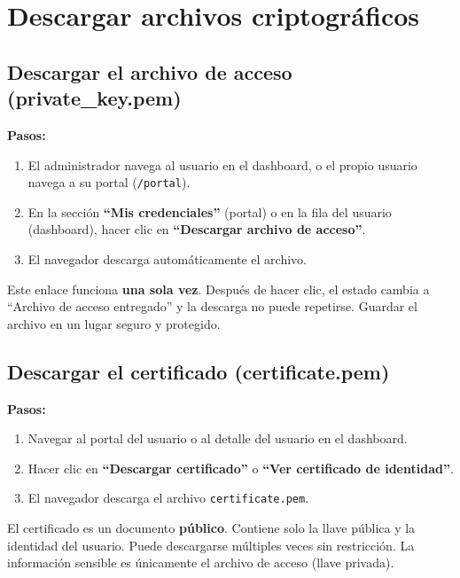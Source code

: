 \documentclass[10pt,letterpaper]{report}
\begin{document}
\section{Descargar archivos criptográficos}

\subsection{Descargar el archivo de acceso (private\_key.pem)}

\textbf{Pasos:}
\begin{enumerate}[leftmargin=2cm]
  \item El administrador navega al usuario en el dashboard, o el propio usuario navega a su portal (\texttt{/portal}).
  \item En la sección \textbf{``Mis credenciales''} (portal) o en la fila del usuario (dashboard), hacer clic en \textbf{``Descargar archivo de acceso''}.
  \item El navegador descarga automáticamente el archivo.
\end{enumerate}

\begin{warningbox}
  Este enlace funciona \textbf{una sola vez}. Después de hacer clic, el estado cambia a ``Archivo de acceso entregado'' y la descarga no puede repetirse. Guardar el archivo en un lugar seguro y protegido.
\end{warningbox}

\subsection{Descargar el certificado (certificate.pem)}

\textbf{Pasos:}
\begin{enumerate}[leftmargin=2cm]
  \item Navegar al portal del usuario o al detalle del usuario en el dashboard.
  \item Hacer clic en \textbf{``Descargar certificado''} o \textbf{``Ver certificado de identidad''}.
  \item El navegador descarga el archivo \texttt{certificate.pem}.
\end{enumerate}

\begin{infobox}[Nota]
  El certificado es un documento \textbf{público}. Contiene solo la llave pública y la identidad del usuario. Puede descargarse múltiples veces sin restricción. La información sensible es únicamente el archivo de acceso (llave privada).
\end{infobox}
\end{document}
